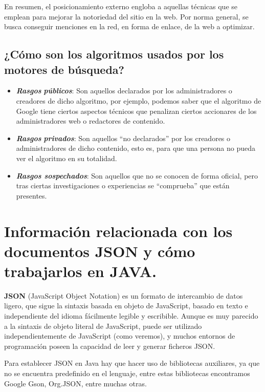 \documentclass[a4paper,11pt]{scrartcl}
\begin{document}
En resumen, el posicionamiento externo engloba a aquellas técnicas que se emplean para mejorar la notoriedad del sitio en la web. Por norma general, se busca conseguir menciones en la red, en forma de enlace, de la web a optimizar. 

\subsection{¿Cómo son los algoritmos usados por los motores de búsqueda? }


\begin{itemize}
\item \textbf{\textit{Rasgos}} \textbf{\textit{públicos}}: Son aquellos declarados por los administradores o creadores de dicho algoritmo, por ejemplo, podemos saber que el algoritmo de Google tiene ciertos aspectos técnicos que penalizan ciertos accionares de los administradores web o redactores de contenido. 
\item \textbf{\textit{Rasgos}} \textbf{\textit{privados}}: Son aquellos “no declarados” por los creadores o administradores de dicho contenido, esto es, para que una persona no pueda ver el algoritmo en su totalidad. 
\item \textbf{\textit{Rasgos sospechados}}: Son aquellos que no se conocen de forma oficial, pero tras ciertas investigaciones o experiencias se “comprueba” que están presentes.\textbf{\textit{}}
\end{itemize}


\section{Información relacionada con los documentos JSON y cómo trabajarlos en JAVA.}

\begin{tcolorbox}
\textbf{JSON} (JavaScript Object Notation) es un formato de intercambio de datos ligero, que sigue la sintaxis basada en objeto de JavaScript, basado en texto e independiente del idioma fácilmente legible y escribible. Aunque es muy parecido a la sintaxis de objeto literal de JavaScript, puede ser utilizado independientemente de JavaScript (como veremos), y muchos entornos de programación poseen la capacidad de leer y generar ficheros JSON.
\end{tcolorbox}

Para establecer JSON en Java hay que hacer uso de bibliotecas auxiliares, ya que no se encuentra predefinido en el lenguaje, entre estas bibliotecas encontramos Google Gson, Org.JSON, entre muchas otras.
\end{document}
